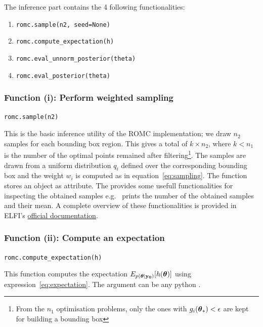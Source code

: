 The inference part contains the 4 following functionalities:

\begin{enumerate}[label=(\roman*)]
\item \texttt{romc.sample(n2, seed=None)}
\item \texttt{romc.compute_expectation(h)}  
\item \texttt{romc.eval_unnorm_posterior(theta)}
\item \texttt{romc.eval_posterior(theta)}
\end{enumerate}

\subsubsection*{Function (i): Perform weighted sampling}

\texttt{romc.sample(n2)}
\vspace{5mm}

\noindent
This is the basic inference utility of the ROMC implementation; we
draw $n_2$ samples for each bounding box region. This gives a total of
$k \times n_2$, where $k < n_1$ is the number of the optimal points
remained after filtering\footnote{From the $n_1$ optimisation
  problems, only the ones with $g_i(\boldsymbol{\theta}_*) < \epsilon$ are kept
  for building a bounding box}. The samples are drawn from a uniform
distribution $q_i$ defined over the corresponding bounding box and the
weight $w_i$ is computed as in equation~\eqref{eq:sampling}. The
function stores an  object as
 attribute. The  provides
some usefull functionalities for inspecting the obtained samples e.g.\
 prints the number of the obtained
samples and their mean. A complete overview of these functionalities is
provided in ELFI's
\href{https://elfi.readthedocs.io/en/latest/api.html#elfi.methods.results.Sample}{official
  documentation}.

\subsubsection*{Function (ii): Compute an expectation}

\texttt{romc.compute_expectation(h)}
\vspace{5mm}

\noindent
This function computes the expectation
$E_{p(\boldsymbol{\theta}|\mathbf{y_0})}[h(\boldsymbol{\theta})]$ using
expression~\eqref{eq:expectation}. The argument  can be
any python \pinline{Callable}.

